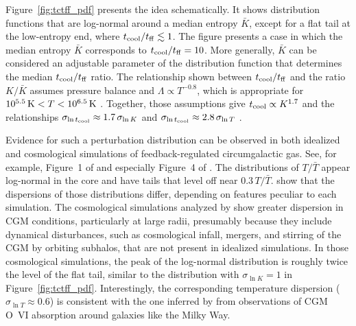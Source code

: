 \documentclass[twocolumn]{aastex63}
\begin{document}
Figure~\ref{fig:tctff_pdf} presents the idea schematically.  It shows distribution functions that are log-normal around a median entropy $\bar{K}$, except for a flat tail at the low-entropy end, where $t_{\rm cool}/t_{\rm ff} \lesssim 1$.  The figure presents a case in which the median entropy $\bar{K}$ corresponds to $t_{\rm cool} / t_{\rm ff} = 10$. More generally, $\bar{K}$ can be considered an adjustable parameter of the distribution function that determines the median $t_{\rm cool}/t_{\rm ff}$ ratio.  The relationship shown between $t_{\rm cool}/t_{\rm ff}$ and the ratio $K/\bar{K}$ assumes pressure balance and $\Lambda \propto T^{-0.8}$, which is appropriate for $10^{5.5} \, {\rm K} < T < 10^{6.5} \, {\rm K}$ \citep[e.g.,][]{sd93,Schure_2009A&A...508..751S}.  Together, those assumptions give $t_{\rm cool} \propto K^{1.7}$ and the relationships $\sigma_{\ln t_{\rm cool}} \approx 1.7 \, \sigma_{\ln K}$ and $\sigma_{\ln t_{\rm cool}} \approx 2.8  \, \sigma_{\ln T}$ \citep[e.g.,][]{Voit_2019ApJ...880..139V}.

Evidence for such a perturbation distribution can be observed in both idealized and cosmological simulations of feedback-regulated circumgalactic gas.  See, for example, Figure~1 of \citet{Lochhaas_2020MNRAS.493.1461L} and especially Figure~4 of \citet{Fielding_2020arXiv200616316F}.  The distributions of $T/\bar{T}$ appear log-normal in the core and have tails that level off near $0.3 \, T/\bar{T}$.  \citet{Fielding_2020arXiv200616316F} show that the dispersions of those distributions differ, depending on features peculiar to each simulation.  The cosmological simulations \citep[from][]{Joung_Accretion_2012ApJ...759..137J, Springel_TNG_2018MNRAS.475..676S} analyzed by \citet{Fielding_2020arXiv200616316F} show greater dispersion in CGM conditions, particularly at large radii, presumably because they include dynamical disturbances, such as cosmological infall, mergers, and stirring of the CGM by orbiting subhalos, that are not present in idealized simulations.  In those cosmological simulations, the peak of the log-normal distribution is roughly twice the level of the flat tail, similar to the distribution with $\sigma_{\ln K} = 1$ in Figure~\ref{fig:tctff_pdf}.  Interestingly, the corresponding temperature dispersion ($\sigma_{\ln T} \approx 0.6$) is consistent with the one inferred by \citet{Voit_2019ApJ...880..139V} from observations of CGM O~VI absorption around galaxies like the Milky Way.
\end{document}
